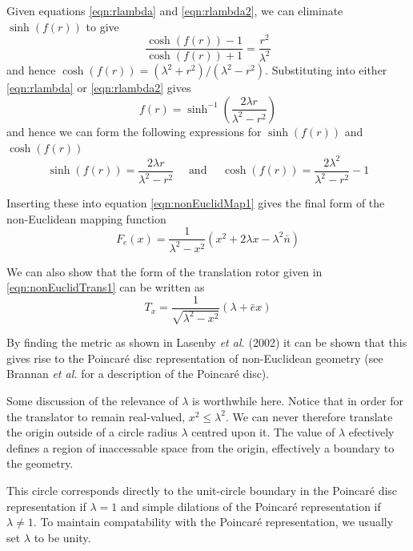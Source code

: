 Given equations \ref{eqn:rlambda} and \ref{eqn:rlambda2}, we can eliminate
$\sinh(f(r))$ to give
\begin{equation}
\frac{\cosh(f(r)) -1}{\cosh(f(r)) + 1} = \frac{r^2}{\lambda^2}
\end{equation}
and hence $\cosh(f(r)) = (\lambda^2 + r^2)/(\lambda^2 - r^2)$. Substituting
into either \ref{eqn:rlambda} or \ref{eqn:rlambda2} gives
\begin{equation}
f(r) = \sinh^{-1}\left( \frac{2\lambda r}{\lambda^2 - r^2} \right)
\end{equation}
and hence we can form the following expressions for 
$\sinh(f(r))$ and $\cosh(f(r))$
\begin{equation}
\sinh(f(r)) = \frac{2\lambda r}{\lambda^2 - r^2} \quad \mbox{ and } \quad
\cosh(f(r)) = \frac{2\lambda^2}{\lambda^2 - r^2} - 1
\end{equation}

Inserting these into equation \ref{eqn:nonEuclidMap1} gives the final form
of the non-Euclidean mapping function
\begin{equation}
F_e(x) = \frac{1}{\lambda^2 - x^2}(x^2 + 2\lambda x - \lambda^2\bar{n})
\label{eqn:nonEuclidMapping}
\end{equation}

We can also show that the form of the translation rotor given in 
\ref{eqn:nonEuclidTrans1} can be written as
\begin{equation}
T_x = \frac{1}{\sqrt{\lambda^2 - x^2}}(\lambda + \bar{e}x)
\end{equation}

By finding the metric as shown in Lasenby \emph{et al.} (2002) it can be shown
that this gives rise to the Poincar\'e disc representation of non-Euclidean
geometry (see Brannan \emph{et al.} \cite{brannan} for a description of the 
Poincar\'e disc).

Some discussion of the relevance of $\lambda$ is worthwhile here. Notice that
in order for the translator to remain real-valued, $x^2 \le \lambda^2$. 
We can never therefore translate the origin outside of a circle radius
$\lambda$ centred upon it. The value of $\lambda$ efectively defines
a region of inaccessable space from the origin, effectively a boundary to
the geometry.

This circle corresponds directly to the unit-circle boundary in the
Poincar\'e disc representation if $\lambda = 1$ and simple dilations of
the Poincar\'e representation if $\lambda \ne 1$. To maintain compatability
with the Poincar\'e representation, we usually set $\lambda$ to be unity.

